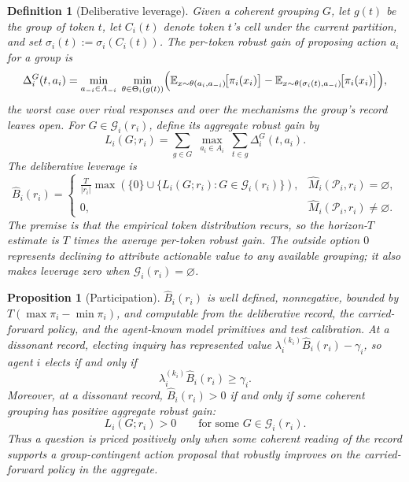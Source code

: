 \documentclass[11pt]{article}
\newtheorem{definition}[assumption]{Definition}
\newtheorem{proposition}[assumption]{Proposition}
\theoremstyle{definition}
\newcommand{\emptysetset}{\varnothing}
\begin{document}
\begin{definition}[Deliberative leverage]
\label{def:leverage}
Given a coherent grouping $G$, let $g(t)$ be the group of token $t$, let $C_i(t)$ denote token $t$'s cell under the current partition, and set $\sigma_i(t):=\sigma_i(C_i(t))$.
The \emph{per-token robust gain} of proposing action $a_i$ for a group is
\[
\Delta_i^G(t,a_i)
=
\min_{a_{-i}\in A_{-i}}\;
\min_{\theta\in\Theta_i(g(t))}
\Bigl(
\mathbb E_{x\sim\theta(a_i,a_{-i})}\!\bigl[\pi_i(x_i)\bigr]
-
\mathbb E_{x\sim\theta(\sigma_i(t),a_{-i})}\!\bigl[\pi_i(x_i)\bigr]
\Bigr),
\]
the worst case over rival responses and over the mechanisms the group's record leaves open.
For $G\in\mathcal G_i(r_i)$, define its aggregate robust gain by
\[
L_i(G;r_i)
=
\sum_{g\in G}\;
\max_{a_i\in A_i}\;
\sum_{t\in g}\Delta_i^G(t,a_i).
\]
The \emph{deliberative leverage} is
\begin{equation}
\widehat B_i(r_i)
=
\begin{cases}
\displaystyle
\frac{T}{\lvert r_i\rvert}
\max\!\left(
\{0\}\cup
\{L_i(G;r_i):G\in\mathcal G_i(r_i)\}
\right),
&
\widehat M_i(\mathcal P_i,r_i)=\emptysetset,
\\[1.1em]
0,
&
\widehat M_i(\mathcal P_i,r_i)\neq\emptysetset.
\end{cases}
\label{eq:leverage}
\end{equation}
The premise is that the empirical token \emph{distribution} recurs, so the horizon-$T$ estimate is $T$ times the average per-token robust gain.
The outside option $0$ represents declining to attribute actionable value to any available grouping; it also makes leverage zero when $\mathcal G_i(r_i)=\emptysetset$.
\end{definition}

\begin{proposition}[Participation]
\label{prop:participation}
$\widehat B_i(r_i)$ is well defined, nonnegative, bounded by $T(\max \pi_i-\min \pi_i)$, and computable from the deliberative record, the carried-forward policy, and the agent-known model primitives and test calibration.
At a dissonant record, electing inquiry has represented value $\lambda_i^{(k_i)}\widehat B_i(r_i)-\gamma_i$, so agent $i$ elects if and only if
\[
\lambda_i^{(k_i)}\widehat B_i(r_i)\geq\gamma_i.
\]
Moreover, at a dissonant record, $\widehat B_i(r_i)>0$ if and only if some coherent grouping has positive aggregate robust gain:
\[
L_i(G;r_i)>0
\qquad\text{for some }G\in\mathcal G_i(r_i).
\]
Thus a question is priced positively only when some coherent reading of the record supports a group-contingent action proposal that robustly improves on the carried-forward policy in the aggregate.
\end{proposition}
\end{document}

